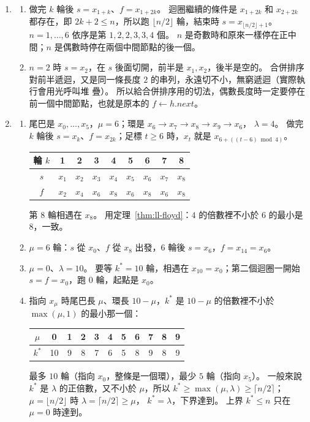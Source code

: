 \begin{enumerate}
\item
\begin{enumerate}
\item 做完 $k$ 輪後 $s = x_{1+k}$、$f = x_{1+2k}$。 迴圈繼續的條件是 $x_{1+2k}$ 和
$x_{2+2k}$ 都存在，即 $2k + 2 \le n$，所以跑 $\lfloor n/2 \rfloor$ 輪，結束時
$s = x_{\lfloor n/2 \rfloor + 1}$。 $n = 1, \ldots, 6$ 依序是第 $1, 2, 2, 3, 3, 4$
個。 $n$ 是奇數時和原來一樣停在正中間；$n$ 是偶數時停在兩個中間節點的後一個。
\item $n = 2$ 時 $s = x_2$，在 $s$ 後面切開，前半是 $x_1, x_2$，後半是空的。 合併排序
對前半遞迴，又是同一條長度 $2$ 的串列，永遠切不小，無窮遞迴（實際執行會用光呼叫堆
疊）。 所以給合併排序用的切法，偶數長度時一定要停在前一個中間節點，也就是原本的
$f \gets h.\mathit{next}$。
\end{enumerate}

\item
\begin{enumerate}
\item 尾巴是 $x_0, \ldots, x_5$，$\mu = 6$；環是 $x_6 \to x_7 \to x_8 \to x_9 \to x_6$，
$\lambda = 4$。 做完 $k$ 輪後 $s = x_k$、$f = x_{2k}$；足標 $t \ge 6$ 時，$x_t$ 就是
$x_{6 + ((t - 6) \bmod 4)}$。
\begin{center}
\begin{tabular}{ccccccccc}
\toprule
輪 $k$ & 1 & 2 & 3 & 4 & 5 & 6 & 7 & 8 \\
\midrule
$s$ & $x_1$ & $x_2$ & $x_3$ & $x_4$ & $x_5$ & $x_6$ & $x_7$ & $x_8$ \\
$f$ & $x_2$ & $x_4$ & $x_6$ & $x_8$ & $x_6$ & $x_8$ & $x_6$ & $x_8$ \\
\bottomrule
\end{tabular}
\end{center}
第 $8$ 輪相遇在 $x_8$。 用定理~\ref{thm:ll-floyd}：$4$ 的倍數裡不小於 $6$ 的最小是
$8$，一致。
\item $\mu = 6$ 輪：$s$ 從 $x_0$、$f$ 從 $x_8$ 出發，$6$ 輪後 $s = x_6$，$f = x_{14} =
x_6$。
\item $\mu = 0$、$\lambda = 10$。  要等 $k^* = 10$ 輪，相遇在
$x_{10} = x_0$；第二個迴圈一開始 $s = f = x_0$，跑 $0$ 輪，起點是 $x_0$。
\item 指向 $x_\mu$ 時尾巴長 $\mu$、環長 $10 - \mu$，$k^*$ 是 $10 - \mu$ 的倍數裡不小於
$\max(\mu, 1)$ 的最小那一個：
\begin{center}
\begin{tabular}{ccccccccccc}
\toprule
$\mu$ & 0 & 1 & 2 & 3 & 4 & 5 & 6 & 7 & 8 & 9 \\
\midrule
$k^*$ & 10 & 9 & 8 & 7 & 6 & 5 & 8 & 9 & 8 & 9 \\
\bottomrule
\end{tabular}
\end{center}
最多 $10$ 輪（指向 $x_0$，整條是一個環），最少 $5$ 輪（指向 $x_5$）。 一般來說
$k^*$ 是 $\lambda$ 的正倍數，又不小於 $\mu$，所以 $k^* \ge \max(\mu, \lambda) \ge
\lceil n/2 \rceil$；$\mu = \lfloor n/2 \rfloor$ 時 $\lambda = \lceil n/2 \rceil \ge \mu$，
$k^* = \lambda$，下界達到。 上界 $k^* \le n$ 只在 $\mu = 0$ 時達到。
\end{enumerate}


\end{enumerate}
